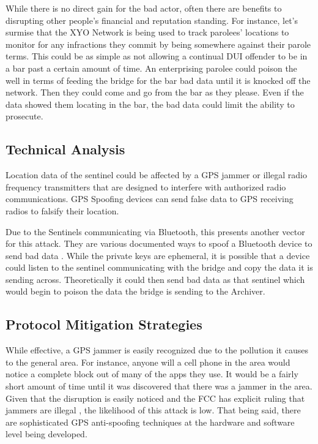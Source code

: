 \documentclass{article}
\begin{document}
While there is no direct gain for the bad actor, often there are benefits to disrupting other people's financial and reputation standing. For instance, let's surmise that the XYO Network is being used to track parolees' locations to monitor for any infractions they commit by being somewhere against their parole terms. This could be as simple as not allowing a continual DUI offender to be in a bar past a certain amount of time. An enterprising parolee could poison the well in terms of feeding the \gls{bridge} for the bar bad data until it is knocked off the network. Then they could come and go from the bar as they please. Even if the data showed them locating in the bar, the bad data could limit the ability to prosecute.

\subsection{Technical Analysis}
Location data of the sentinel could be affected by a GPS jammer or illegal radio frequency transmitters that are designed to interfere with authorized radio communications. GPS Spoofing devices \cite{gps1} can send false data to GPS receiving radios to falsify their location. 

Due to the Sentinels communicating via Bluetooth, this presents another vector for this attack. They are various documented ways to spoof a Bluetooth device to send bad data \cite{bluetooth1}. While the private keys are ephemeral, it is possible that a device could listen to the sentinel communicating with the \gls{bridge} and copy the data it is sending across. Theoretically it could then send bad data as that sentinel which would begin to poison the data the \gls{bridge} is sending to the Archiver. 

\subsection{Protocol Mitigation Strategies}
While effective, a GPS jammer is easily recognized due to the pollution it causes to the general area. For instance, anyone will a cell phone in the area would notice a complete block out of many of the apps they use. It would be a fairly short amount of time until it was discovered that there was a jammer in the area. Given that the disruption is easily noticed and the FCC has explicit ruling that jammers are illegal \cite{fcc1}, the likelihood of this attack is low. That being said, there are sophisticated GPS anti-spoofing techniques at the hardware and software level being developed. \cite{gps1}
\end{document}

